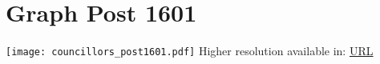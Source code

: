 \section{Graph Post 1601}
\texttt{[image: councillors\_post1601.pdf]}
Higher resolution available in: \url{URL}